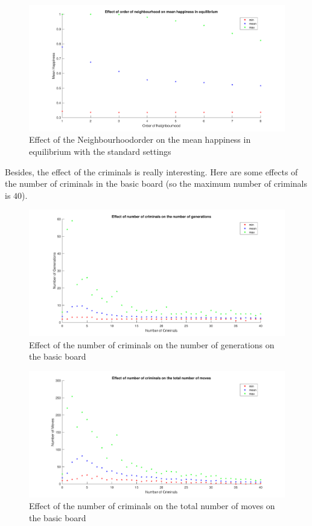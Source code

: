 \begin{figure}[H]
	\centering
    \includegraphics[width=\textwidth]{buurtorde-gemeindhappiness.pdf}
    \caption{Effect of the Neighbourhoodorder on the mean happiness in equilibrium with the standard settings}
    \label{fig:nbho-happiness}
\end{figure}

Besides, the effect of the criminals is really interesting.
Here are some effects of the number of criminals in the basic board (so the maximum number of criminals is $40$).

\begin{figure}[H]
	\centering
    \includegraphics[width=\textwidth]{aantcrim-aantgen.pdf}
    \caption{Effect of the number of criminals on the number of generations on the basic board }
    \label{fig:cr-aantgen}
\end{figure}

\begin{figure}[H]
	\centering
    \includegraphics[width=\textwidth]{aantcrim-aantmov.pdf}
    \caption{Effect of the number of criminals on the total number of moves on the basic board}
    \label{fig:cr-aantmov}
\end{figure}

